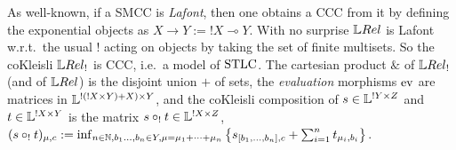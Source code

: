 \begin{comment}

In order to interpret the full $\STLC$, we need a Cartesian closed category (CCC).
It is well-known \cite{Mellies2009} that it is always possible to construct a CCC by taking the \emph{co-Kleisli} $\C C_!$ of a so-called \emph{Lafont category} $\C C$.
A SMCC is Lafont when it has finite products and it is equipped with a comonad $!$ (its \emph{Lafont exponential}) which, at level of objects, sends $X$ to an object $!X$ being the free commutative comonoid on $X$.
Such objects $!X$ represent the \emph{bang} connective of linear logic, granting infinite duplications via the infinite product $X^0\otimes X\otimes X^2\otimes X^3\otimes\cdots$, each factor representing a possible number of duplications.
It is well-known that, under mild conditions satisfied by $\QREL$, one can explicit this idea via the fact that the map $X\mapsto \finMS{X}$ (where $\finMS{X}$ is the set of finite multi-sets on $X$) lifts to a functor $!:\QREL\to\QREL$ which is a Lafont-exponential comonad.
Specializing [Corollary III.6, \cite{Manzo2013}] to our case, we have:

\begin{proposition}
 $\LREL$ is Lafont.
\end{proposition}

\end{comment}

As well-known, if a SMCC is \emph{Lafont}, then one obtains a CCC from it by defining the exponential objects as $X\to Y:=!X \multimap Y$.
With no surprise $\LREL$ is Lafont~\cite[Corollary III.6]{Manzo2013} %
w.r.t.\ the usual $!$ acting on objects by taking the set of finite multisets.
So the coKleisli $\LREL_!$ is CCC, i.e.\ a model of $\mathrm{STLC}$.
The cartesian product $\&$ of $\LREL_!$ (and of $\LREL$) is the disjoint union $+$ of sets, the \emph{evaluation} morphisms $\mathrm{ev}$ are matrices in $\mathbb{L}^{!(!X\times Y)+X)\times Y}$, and the coKleisli composition of $s\in\mathbb{L}^{!Y\times Z}$ and $t\in\mathbb{L}^{!X\times Y}$ is the matrix $s\circ_! t\in\mathbb{L}^{!X\times Z}$, $(s\circ_! t)_{\mu,c}:=
\inf_{n\in\mathbb{N}, b_1\dots,b_n\in Y, \mu = \mu_1+\cdots +\mu_n}
 \left\{s_{[b_1,\dots,b_n],c} + \sum_{i=1}^n t_{\mu_i,b_i}\right\}$.

